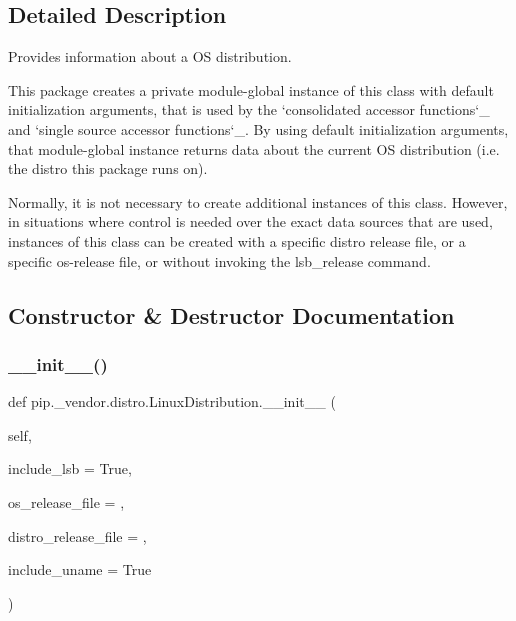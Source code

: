 \subsection{Detailed Description}
\begin{DoxyVerb}Provides information about a OS distribution.

This package creates a private module-global instance of this class with
default initialization arguments, that is used by the
`consolidated accessor functions`_ and `single source accessor functions`_.
By using default initialization arguments, that module-global instance
returns data about the current OS distribution (i.e. the distro this
package runs on).

Normally, it is not necessary to create additional instances of this class.
However, in situations where control is needed over the exact data sources
that are used, instances of this class can be created with a specific
distro release file, or a specific os-release file, or without invoking the
lsb_release command.
\end{DoxyVerb}
 

\subsection{Constructor \& Destructor Documentation}
\mbox{\label{classpip_1_1__vendor_1_1distro_1_1LinuxDistribution_afa7f53e289ee8fa158ffd45ef59bf110}} 
\subsubsection{\texorpdfstring{\+\_\+\+\_\+init\+\_\+\+\_\+()}{\_\_init\_\_()}}
{\footnotesize\ttfamily def pip.\+\_\+vendor.\+distro.\+Linux\+Distribution.\+\_\+\+\_\+init\+\_\+\+\_\+ (\begin{DoxyParamCaption}\item[{}]{self,  }\item[{}]{include\+\_\+lsb = {\ttfamily True},  }\item[{}]{os\+\_\+release\+\_\+file = {\ttfamily \textquotesingle{}\textquotesingle{}},  }\item[{}]{distro\+\_\+release\+\_\+file = {\ttfamily \textquotesingle{}\textquotesingle{}},  }\item[{}]{include\+\_\+uname = {\ttfamily True} }\end{DoxyParamCaption})}

